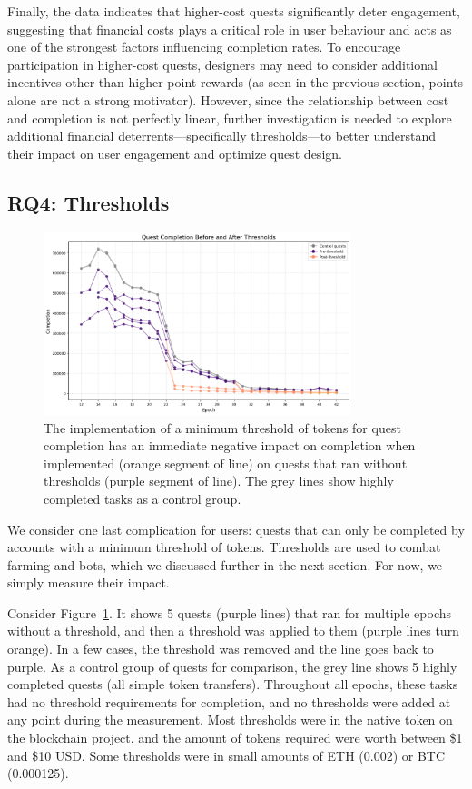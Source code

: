 Finally, the data indicates that higher-cost quests significantly deter engagement, suggesting that financial costs plays a critical role in user behaviour and acts as one of the strongest factors influencing completion rates. 
To encourage participation in higher-cost quests, designers may need to consider additional incentives other than higher point rewards (as seen in the previous section, points alone are not a strong motivator).
However, since the relationship between cost and completion is not perfectly linear, further investigation is needed to explore additional financial deterrents—specifically thresholds—to better understand their impact on user engagement and optimize quest design. 



\subsection{RQ4: Thresholds}

\begin{figure}[t]
    \centering
    \includegraphics[width=0.8\textwidth]{figures/threshold.png}
    \caption{The implementation of a minimum threshold of tokens for quest completion has an immediate negative impact on completion when implemented (orange segment of line) on quests that ran without thresholds (purple segment of line). The grey lines show highly completed tasks as a control group. \label{fig:threshold}}
\end{figure}

We consider one last complication for users: quests that can only be completed by accounts with a minimum threshold of tokens. Thresholds are used to combat farming and bots, which we discussed further in the next section. For now, we simply measure their impact. 

Consider Figure~\ref{fig:threshold}. It shows 5 quests (purple lines) that ran for multiple epochs without a threshold, and then a threshold was applied to them (purple lines turn orange). In a few cases, the threshold was removed and the line goes back to purple. As a control group of quests for comparison, the grey line shows 5 highly completed quests (all simple token transfers). Throughout all epochs, these tasks had no threshold requirements for completion, and no thresholds were added at any point during the measurement. Most thresholds were in the native token on the blockchain project, and the amount of tokens required were worth between \$1 and \$10 USD. Some thresholds were in small amounts of ETH (0.002) or BTC (0.000125). 

